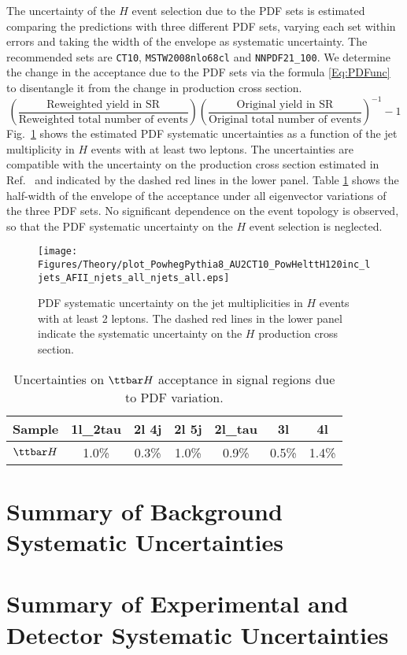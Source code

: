 The uncertainty of the \ttbar$H$ event selection due to the PDF sets is estimated comparing the predictions with three different PDF sets, varying each set within errors and taking the width of the envelope as systematic uncertainty. The recommended sets are \verb+CT10+, \verb+MSTW2008nlo68cl+ and \verb+NNPDF21_100+. 
We determine the change in the acceptance due to the PDF sets via the formula \ref{Eq:PDFunc} to disentangle it from the change in production cross section.
\begin{equation} \label{Eq:PDFunc}
\left(\frac{\textrm{Reweighted yield in SR}}{\textrm{Reweighted total number of events}}\right)\left(\frac{\textrm{Original yield in SR}}{\textrm{Original total number of events}}\right)^{-1}-1
\end{equation}
Fig.~\ref{fig:theosystPDF} shows the estimated PDF systematic uncertainties as a function of the jet multiplicity in \ttbar$H$ events with at least two leptons. The uncertainties are compatible with the uncertainty on the production cross section estimated in Ref.~\cite{Heinemeyer:2013tqa} and indicated by the dashed red lines in the lower panel. 
Table \ref{tab:pdfaccttH} shows the half-width of the envelope of the acceptance under all eigenvector variations of the three PDF sets.
No significant dependence on the event topology is observed, so that the PDF systematic uncertainty on the \ttbar$H$ event selection is neglected.
\begin{figure}[htbp]
\begin{center}
\texttt{[image: Figures/Theory/plot\_PowhegPythia8\_AU2CT10\_PowHelttH120inc\_ljets\_AFII\_njets\_all\_njets\_all.eps]}
\caption{PDF systematic uncertainty on the jet multiplicities in \ttbar$H$ events with at least 2 leptons. The dashed red lines in the lower panel indicate the systematic uncertainty on the \ttbar$H$ production cross section.}
\label{fig:theosystPDF}
\end{center}
\end{figure}
\begin{table}
\begin{center}
\caption{\label{tab:pdfaccttH}Uncertainties on $\ttbar H$ acceptance in signal
  regions due to PDF variation.}
\begin{tabular}{r|c|c|c|c|c|c}
Sample & 1l\_2tau & 2l 4j & 2l 5j & 2l\_tau & 3l & 4l\\
\hline
$\ttbar H$ & 1.0\% & 0.3\% & 1.0\% & 0.9\% & 0.5\% & 1.4\%\\
\end{tabular}
\end{center}
\end{table}




\section{Summary of Background Systematic Uncertainties}


\section{Summary of Experimental and Detector Systematic Uncertainties}



